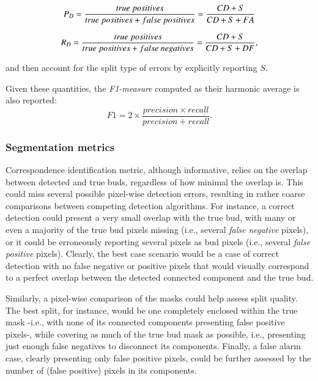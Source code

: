 \documentclass[a4paper,authoryear,review]{elsarticle}
\begin{document}
	\begin{equation}
	P_D = \frac{true\ positives}{true\ positives+false\ positives} \\
	= \frac{CD+S}{CD+S+FA}
	\label{eq:detection-precision}
	\end{equation}
	
	\begin{equation}
	R_D = \frac{true\ positives}{true\ positives+false\ negatives} \\
	= \frac{CD+S}{CD+S+DF},
	\label{eq:detection-recall}
	\end{equation}
	
	and then account for the split type of errors by explicitly reporting $S$. 
	
	Given these quantities, the \emph{F1-measure} computed as their harmonic average is also reported:
	\[
	F1 = 2 \times \frac{precision \times recall}{precision + recall}.
	\] 
	
	\subsubsection{Segmentation metrics}
	\label{subsec:segmetrics}
	
	Correspondence identification metric, although informative, relies on the overlap between detected and true buds, regardless of how minimal the overlap is. This could miss several possible pixel-wise detection errors, resulting in rather coarse comparisons between competing detection algorithms. For instance, a correct detection could present a very small overlap with the true bud, with many or even a majority of the true bud pixels missing (i.e., several \emph{false negative} pixels), or it could be erroneously reporting several pixels as bud pixels (i.e., several \emph{false positive} pixels). Clearly, the best case scenario would be a case of correct detection with no false negative or positive pixels that would visually correspond to a perfect overlap between the detected connected component and the true bud. 
	
	Similarly, a pixel-wise comparison of the masks could help assess split quality. The best split, for instance, would be one completely enclosed within the true mask -i.e., with none of its connected components presenting false positive pixels-, while covering as much of the true bud mask as possible, i.e., presenting just enough false negatives to disconnect its components. Finally, a false alarm case, clearly presenting only false positive pixels, could be further assessed by the number of (false positive) pixels in its components. 
	
\end{document}
